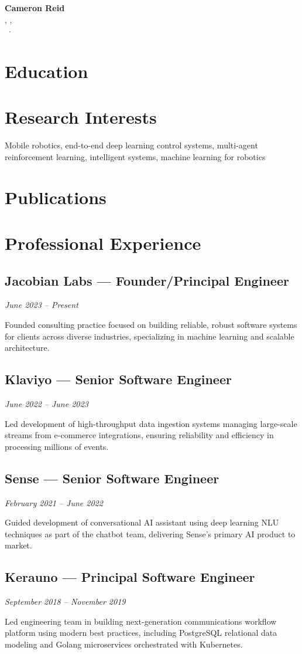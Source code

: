 \documentclass[11pt,letterpaper]{article}
\newcommand{\makeaddress}{%
	\street, \city, \state \zip \\
	\phone\ $\cdot$ \email
}
\newcommand{\job}[4]{%
	\subsection{#1 --- #2}
	\textit{#3}

	#4

	\vspace{0.1in}
}
\newcommand{\makepublications}{%
	\begin{enumerate} [label={[\arabic*]}, leftmargin=2em]
		\publist
	\end{enumerate}
}
\newcommand{\makeeducations}{%
	\begin{enumerate} [label={[\arabic*]}, leftmargin=2em]
		\edlist
	\end{enumerate}
}
\begin{document}


\begin{center}
{\huge\bfseries{Cameron Reid}}\\[0.1in]
\makeaddress
\end{center}

\section{Education}

\makeeducations

\section{Research Interests}

Mobile robotics, end-to-end deep learning control systems, multi-agent reinforcement learning, intelligent systems, machine learning for robotics

\section{Publications}

\makepublications

\section{Professional Experience}

\job{Jacobian Labs}{Founder/Principal Engineer}{June 2023 -- Present}{Founded consulting practice focused on building reliable, robust software systems for clients across diverse industries, specializing in machine learning and scalable architecture.}

\job{Klaviyo}{Senior Software Engineer}{June 2022 -- June 2023}{Led development of high-throughput data ingestion systems managing large-scale streams from e-commerce integrations, ensuring reliability and efficiency in processing millions of events.}

\job{Sense}{Senior Software Engineer}{February 2021 -- June 2022}{Guided development of conversational AI assistant using deep learning NLU techniques as part of the chatbot team, delivering Sense's primary AI product to market.}

\job{Kerauno}{Principal Software Engineer}{September 2018 -- November 2019}{Led engineering team in building next-generation communications workflow platform using modern best practices, including PostgreSQL relational data modeling and Golang microservices orchestrated with Kubernetes.}
\end{document}
